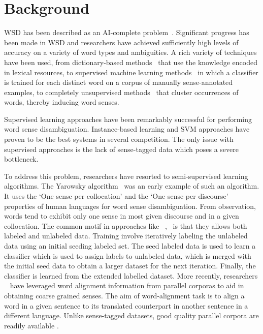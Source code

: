 \documentclass[11pt,letterpaper]{article}
\newcommand{\blue}[1]{\textcolor{RoyalBlue}{#1}}
\newcommand{\instructions}[1]{\blue{\textit{#1}}}
\begin{document}
\section{Background}
\label{sec:background}

WSD has been described as an AI-complete problem~\cite{mallery1988thinking}. Significant progress has been made in WSD and researchers have achieved sufficiently high levels of accuracy on a variety of word types and ambiguities. A rich variety of techniques have been used, from dictionary-based methods~\cite{mihalcea2007using} that use the knowledge encoded in lexical resources, to supervised machine learning methods~\cite{manning1999foundations} in which a classifier is trained for each distinct word on a corpus of manually sense-annotated examples, to completely unsupervised methods~\cite{yarowsky1995unsupervised} that cluster occurrences of words, thereby inducing word senses.

Supervised learning approaches have been remarkably successful for performing word sense disambiguation. Instance-based learning and SVM approaches have proven to be the best systems in several competition. The only issue with supervised approaches is the lack of sense-tagged data which poses a severe bottleneck. 

To address this problem, researchers have resorted to semi-supervised learning algorithms. The Yarowsky algorithm~\cite{yarowsky1995unsupervised} was an early example of such an algorithm. It uses the `One sense per collocation' and the `One sense per discourse' properties of human languages for word sense disambiguation. From observation, words tend to exhibit only one sense in most given discourse and in a given collocation. The common motif in approaches like ~\cite{yarowsky1995unsupervised},~\cite{le2008semi} is that they allows both labeled and unlabeled data. Training involve iteratively labeling the unlabeled data using an initial seeding labeled set. The seed labeled data is used to learn a classifier which is used to assign labels to unlabeled data, which is merged with the initial seed data to obtain a larger dataset for the next iteration. Finally, the classifier is learned from the extended labelled dataset.
More recently, researchers ~\cite{Ng} have leveraged word alignment information from parallel corporas to aid in obtaining coarse grained senses. The aim of word-alignment task is to align a word in a given sentence to its translated counterpart in another sentence in a different language. Unlike sense-tagged datasets, good quality parallel corpora are readily available . 
\end{document}
